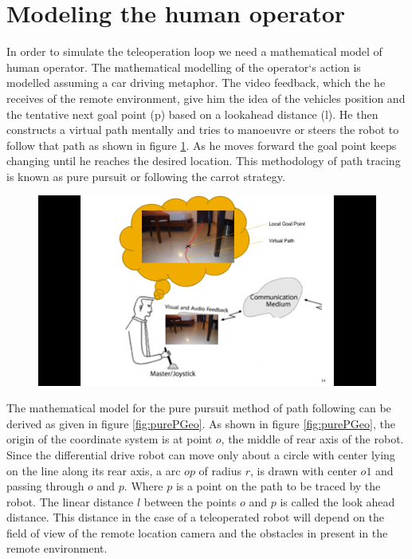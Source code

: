 \section{Modeling the human operator}
In order to simulate the teleoperation loop we need a mathematical model of human operator. The mathematical  modelling of the operator`s action is modelled assuming a car driving metaphor. The video feedback, which the he receives of the remote environment, give him the idea of the vehicles  position and the tentative next goal point (p) based on a lookahead distance (l). He then constructs a  virtual path mentally and tries to manoeuvre or steers the robot to follow that path as shown in figure \ref{fig:drivingStratagy}. As he moves forward the goal point keeps changing until he reaches the desired location. This methodology of path tracing is known as pure pursuit \cite{coulter1992implementation} or following the carrot strategy. 
\begin{figure}
	\includegraphics[width=\linewidth,keepaspectratio]{Chapter6/fig/mentalMap}
	\label{fig:drivingStratagy} 
\end{figure}

The mathematical model for the pure pursuit method of path following can be derived as given in figure \ref{fig:purePGeo}.
As shown in figure \ref{fig:purePGeo}, the origin of the coordinate system is at point $o$, the middle of rear axis of the robot. Since the differential drive robot  can move only about a circle with center  lying on the line along its rear axis, a arc $op$ of radius $r$, is drawn with center $o1$ and passing through $o$ and $p$. Where $p$ is a point on the path to be traced by the robot. The linear distance $l$ between the points $o$ and  $p$ is called the look ahead distance. This distance in the case of a teleoperated robot will depend on the field of view of the remote location camera and the obstacles in present in the remote environment.

